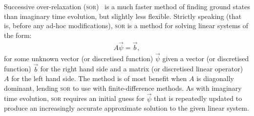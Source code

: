 Successive over-relaxation (\textsc{sor})~\cite{young_iterative_1950} is a much faster method of finding ground states than imaginary time evolution, but slightly less flexible. Strictly speaking (that is, before any ad-hoc modifications), \textsc{sor} is a method for solving linear systems of the form:
\begin{align}\label{eq:linear_system_SOR}
A \vec \psi = \vec b,
\end{align} 
for some unknown vector (or discretised function) $\vec \psi$ given a vector (or discretised function) $\vec b$ for the right hand side and a  matrix (or discretised linear operator) $A$ for the left hand side. The method is of most benefit when $A$ is diagonally dominant, lending \textsc{sor} to use with finite-difference methods. As with imaginary time evolution, \textsc{sor} requires an initial guess for $\vec\psi$ that is repeatedly updated to produce an increasingly accurate approximate solution to the given linear system.

